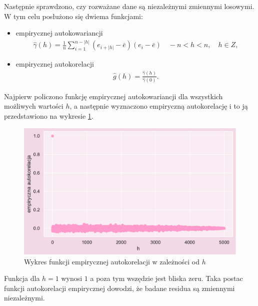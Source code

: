 \documentclass{article}
\begin{document}
Następnie sprawdzono, czy rozważane dane są niezależnymi zmiennymi losowymi. W tym celu posłużono się dwiema funkcjami: 
\begin{itemize}
    \item empirycznej autokowariancji 
 \begin{align*}
        \hat{\gamma}(h) = \frac{1}{n} \sum\limits_{i=1}^{n-|h|} (e_{i+|h|}-\bar{e})(e_i-\bar{e}) \quad -n<h<n,\quad h \in Z,
    \end{align*}
    \item empirycznej autokorelacji
 \begin{align*}
        \hat{g}(h) = \frac{\hat{\gamma}(h)}{\hat{\gamma}(0)}. 
    \end{align*}
\end{itemize}
Najpierw policzono funkcję empirycznej autokowariancji dla wszystkich możliwych wartości $h$, a następnie wyznaczono empiryczną autokorelację i to ją przedstawiono na wykresie \ref{acf}.
    \begin{figure}[H]
	\begin{center}
		\includegraphics[scale=0.68]{images/acf.pdf}
		\caption{Wykres funkcji empirycznej autokorelacji w zależności od $h$}
		\label{acf}
	\end{center}
    \end{figure}
\noindent Funkcja dla $h=1$ wynosi $1$ a poza tym wszędzie jest bliska zeru. Taka postac funkcji autokorelacji empirycznej dowodzi, że badane residua są zmiennymi niezależnymi.\\
\end{document}
